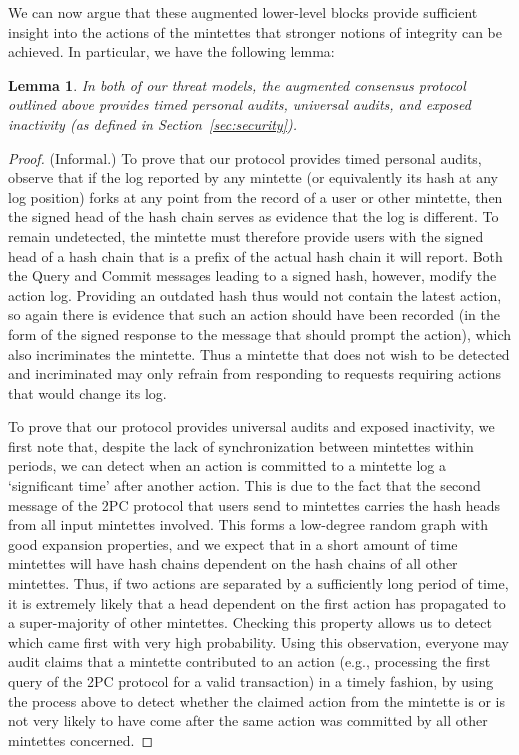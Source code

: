 \documentclass[conference]{IEEEtran}
\newtheorem{lemma}[theorem]{Lemma}
\newcommand{\aquery}{\textsf{Query}\xspace}
\newcommand{\acommit}{\textsf{Commit}\xspace}
\begin{document}
We can now argue that these augmented lower-level blocks provide sufficient
insight into the actions of the mintettes that stronger notions of integrity
can be achieved.  In particular, we have the following lemma:

\begin{lemma}\label{lem:security}
In both of our threat models, the augmented consensus protocol outlined above
provides timed personal audits, universal audits, and exposed inactivity (as
defined in Section~\ref{sec:security}).
\end{lemma}

\begin{proof}
(Informal.)
To prove that our protocol provides timed personal audits, observe that if
the log reported by any
mintette (or equivalently its hash at any log position) forks at any point
from the record of a user or other mintette, then
the signed head of the hash chain serves as evidence that the log
is different.  To remain undetected, the mintette must therefore provide
users with the signed head of a hash chain that is a prefix of the actual
hash chain it will report.
Both the \aquery and \acommit messages leading to a signed hash, however,
modify the action log.  Providing an outdated hash thus would not contain
the latest action, so again there is evidence that such an action should have
been recorded (in the form of the signed response to the message that should
prompt the action), which also incriminates the mintette. Thus a mintette that
does not wish to be detected and incriminated may only refrain from responding
to requests requiring actions that would change its log.

To prove that our protocol provides universal audits and exposed inactivity,
we first note that,
despite the lack of synchronization between mintettes within periods, we can
detect when an action is committed to a mintette log a `significant time'
after another action.  This is due to the fact that the second message of the
2PC protocol that users send to mintettes carries the hash heads from
all input mintettes involved.  This forms a low-degree random graph with good
expansion properties, and we expect that in a short amount of time mintettes
will have hash chains dependent on the hash chains of all other mintettes.
Thus, if two actions are separated by a sufficiently long period of time, it
is extremely likely that a head dependent on the first action has propagated
to a
super-majority of other mintettes. Checking this property allows us to detect
which came first with very high probability. Using this observation, everyone
may audit claims that a mintette contributed to an action (e.g., processing
the first query of the 2PC protocol for a valid transaction) in a timely
fashion, by using the process above to detect whether the claimed action
from the mintette is or is not very likely to have come after the same action
was committed by all other mintettes concerned.
\end{proof}
\end{document}
